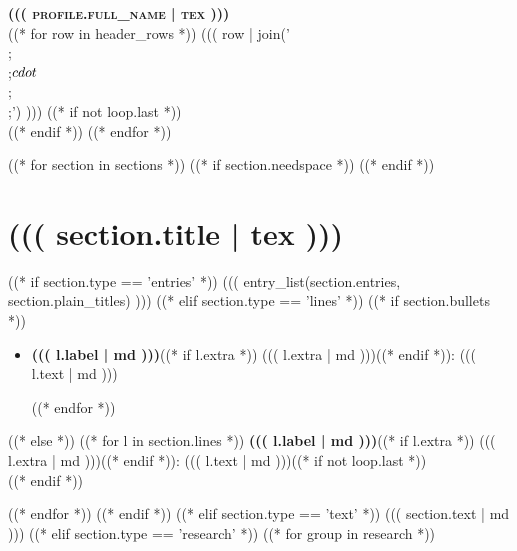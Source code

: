 \documentclass[a4paper,10pt]{article}
\def\name{((( profile.full_name | tex )))}
\begin{document}
\begin{center}
    {\LARGE\bfseries\scshape\color{headercolor} \name}\\[6pt]
    {\small
((* for row in header_rows *))
    ((( row | join('\n    \\;\\;$\\cdot$\\;\\;\n    ') )))
((* if not loop.last *))
    \\[3pt]
((* endif *))
((* endfor *))
    }
\end{center}

\vspace{-0.5em}

((* for section in sections *))
((* if section.needspace *))
((* endif *))
\section*{((( section.title | tex )))}
((* if section.type == 'entries' *))
((( entry_list(section.entries, section.plain_titles) )))
((* elif section.type == 'lines' *))
((* if section.bullets *))
\begin{itemize}[itemsep=0.3em]
((* for l in section.lines *))
    \item \textbf{((( l.label | md )))}((* if l.extra *)) ((( l.extra | md )))((* endif *)): ((( l.text | md )))

((* endfor *))
\end{itemize}
((* else *))
((* for l in section.lines *))
\textbf{((( l.label | md )))}((* if l.extra *)) ((( l.extra | md )))((* endif *)): ((( l.text | md )))((* if not loop.last *))\\[((( '6pt' if loop.nextitem.space_before else '2pt' )))]((* endif *))

((* endfor *))
((* endif *))
((* elif section.type == 'text' *))
((( section.text | md )))
((* elif section.type == 'research' *))
((* for group in research *))
\end{document}
